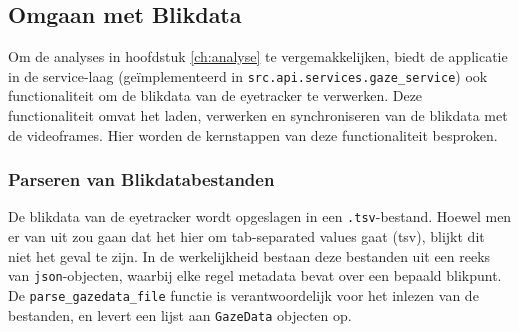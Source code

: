 
\subsection{Omgaan met Blikdata}
\label{sec:omgaan-met-blikdata}

Om de analyses in hoofdstuk \ref{ch:analyse} te vergemakkelijken, biedt de applicatie 
in de service-laag (geïmplementeerd in \texttt{src.api.services.gaze\_service}) ook functionaliteit om de blikdata van de eyetracker te verwerken.
Deze functionaliteit omvat het laden, verwerken en synchroniseren van de blikdata met de videoframes.
Hier worden de kernstappen van deze functionaliteit besproken.

\subsubsection{Parseren van Blikdatabestanden}

De blikdata van de eyetracker wordt opgeslagen in een \texttt{.tsv}-bestand.
Hoewel men er van uit zou gaan dat het hier om tab-separated values gaat (tsv), blijkt dit niet het geval te zijn.
In de werkelijkheid bestaan deze bestanden uit een reeks van \texttt{json}-objecten, waarbij elke regel metadata bevat over een bepaald blikpunt.
De \texttt{parse\_gazedata\_file} functie is verantwoordelijk voor het inlezen van de bestanden, 
en levert een lijst aan \texttt{GazeData} objecten op.

